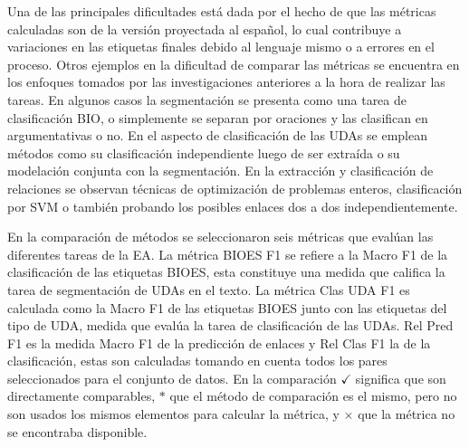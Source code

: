 \documentclass[a4paper,11pt,twocolumn,twoside]{article}
\begin{document}
Una de las principales dificultades está dada por el hecho de que las métricas calculadas son de la versión proyectada
al español, lo cual contribuye a variaciones en las etiquetas finales debido al lenguaje mismo 
o a errores en el proceso. Otros ejemplos en la dificultad de comparar las métricas se encuentra
en los enfoques tomados por las investigaciones anteriores a la hora de realizar las tareas.
En algunos casos la segmentación se presenta como una tarea de clasificación BIO, o simplemente 
se separan por oraciones y las clasifican en argumentativas o no. En el aspecto de clasificación
de las UDAs se emplean métodos como su clasificación independiente luego de ser extraída o su modelación
conjunta con la segmentación. En la extracción y clasificación de relaciones se observan técnicas de 
optimización de problemas enteros, clasificación por SVM o también probando los posibles enlaces dos 
a dos independientemente.

En la comparación de métodos se seleccionaron seis métricas que evalúan las diferentes 
tareas de la EA. La métrica BIOES F1 se refiere 
a la Macro F1 de la clasificación de las etiquetas BIOES, esta constituye una medida
que califica la tarea de segmentación de UDAs en el texto. La métrica Clas UDA F1 es 
calculada como la Macro F1 de las etiquetas BIOES junto con las etiquetas del tipo de 
UDA, medida que evalúa la tarea de clasificación de las UDAs. Rel Pred F1 es la medida 
Macro F1 de la predicción de enlaces y Rel Clas F1 la de la clasificación, estas 
son calculadas tomando en cuenta todos los pares seleccionados para el conjunto de 
datos. En la comparación $\checkmark$ significa que son directamente comparables,
$*$ que el método de comparación es el mismo, pero no son usados los mismos 
elementos para calcular la métrica, y $\times$ que la métrica no se encontraba disponible.
\end{document}
